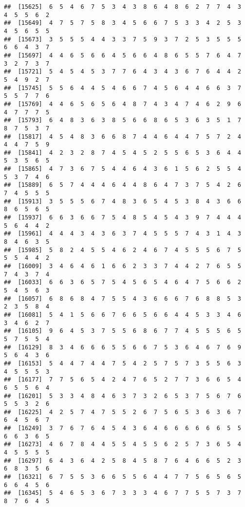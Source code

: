 \documentclass[
]{book}
\begin{document}
\begin{verbatim}
##  [15625]  6  5  4  6  7  5  3  4  3  8  6  4  8  6  2  7  7  4  3  4  5  5  6  2
##  [15649]  4  7  5  7  5  8  3  4  5  6  6  7  5  3  3  4  2  5  3  4  5  6  5  5
##  [15673]  3  5  5  5  4  4  3  3  7  5  9  3  7  2  5  3  5  5  5  6  6  4  3  7
##  [15697]  4  4  6  5  6  6  4  5  6  6  4  8  6  5  5  7  6  4  7  3  2  7  3  7
##  [15721]  5  4  5  4  5  3  7  7  6  4  3  4  3  6  7  6  4  4  2  5  4  9  2  7
##  [15745]  5  5  6  4  4  5  4  6  6  7  4  5  6  4  4  6  6  3  7  5  5  7  7  6
##  [15769]  4  4  6  5  6  5  6  4  8  7  4  3  4  7  4  6  2  9  6  4  7  7  7  5
##  [15793]  6  4  8  3  6  3  8  5  6  6  8  6  5  3  6  3  5  1  7  8  7  5  3  7
##  [15817]  4  5  4  8  3  6  6  8  7  4  4  6  4  4  7  5  7  2  4  4  4  7  5  9
##  [15841]  4  2  3  2  8  7  4  5  4  5  2  5  5  6  5  3  6  4  4  5  3  5  6  5
##  [15865]  4  7  3  6  7  5  4  4  6  4  3  6  1  5  6  2  5  5  4  5  3  7  4  6
##  [15889]  6  5  7  4  4  4  6  4  4  8  6  4  7  3  7  5  4  2  6  7  4  5  5  5
##  [15913]  3  5  5  5  6  7  4  8  3  6  5  4  5  3  8  4  3  6  6  8  6  5  6  5
##  [15937]  6  6  3  6  6  7  5  4  8  5  4  5  4  3  9  7  4  4  4  5  6  4  4  2
##  [15961]  4  4  4  3  4  3  6  3  7  4  5  5  5  7  4  3  1  4  3  8  4  6  3  5
##  [15985]  5  8  2  4  5  5  4  6  2  4  6  7  4  5  5  5  6  7  5  5  5  4  4  2
##  [16009]  3  4  6  4  6  1  6  6  2  3  3  7  4  4  2  7  6  5  5  7  4  3  7  4
##  [16033]  6  6  3  6  5  7  5  4  5  6  5  4  6  4  7  5  6  6  2  5  4  5  6  3
##  [16057]  6  8  6  8  4  7  5  5  4  3  6  6  6  7  6  8  8  5  3  2  3  5  8  4
##  [16081]  5  4  1  5  6  6  7  6  6  5  6  6  4  4  5  3  3  4  6  3  4  6  2  7
##  [16105]  9  6  4  5  3  7  5  5  6  8  6  7  7  4  5  5  5  6  5  5  7  5  5  4
##  [16129]  8  3  4  6  6  6  5  5  6  6  7  5  3  6  4  6  7  6  9  5  6  4  3  6
##  [16153]  5  4  4  7  4  4  7  5  4  2  5  7  5  7  3  5  5  6  3  4  5  5  5  3
##  [16177]  7  7  5  6  5  4  2  4  7  6  5  2  7  7  3  6  6  5  4  6  5  5  6  4
##  [16201]  5  3  3  4  8  4  6  3  7  3  2  6  5  3  7  5  6  7  6  5  5  3  2  6
##  [16225]  4  2  5  7  4  7  5  5  2  6  7  5  6  5  3  6  3  6  7  6  4  5  6  7
##  [16249]  3  7  6  7  6  4  5  4  3  6  4  6  6  6  6  6  6  5  5  6  6  3  6  5
##  [16273]  4  6  7  8  4  4  5  5  4  5  5  6  2  5  7  3  6  5  4  4  5  5  5  5
##  [16297]  6  4  3  6  4  2  5  8  4  5  8  7  6  4  6  6  5  2  3  6  8  3  5  6
##  [16321]  6  7  5  5  3  6  6  5  5  6  4  4  7  7  5  6  5  6  5  6  6  4  5  6
##  [16345]  5  4  6  5  3  6  7  3  3  3  4  6  7  7  5  5  7  3  7  8  7  6  4  5

\end{verbatim}
\end{document}
